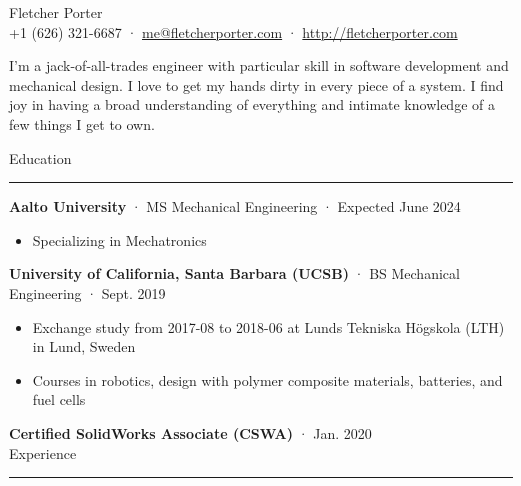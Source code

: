 \documentclass[12pt, oneside]{article}
\newcommand{\titlestyle}[1] {
	{\fontsize{40pt}{1em}\selectfont \textcolor{new_red}{\textsf{#1}}} \\
}
\newcommand{\headingstyleJobs}[1] {
	{\fontsize{18pt}{1em}\selectfont \textcolor{new_red}{\textsf{#1}}}
	\textcolor{new_red}{\rule{3.25in}{0.5pt}} \vspace{3pt}
}
\newcommand{\infostyle}[1] {
	{\selectfont #1} \\ %
}
\newcommand{\jobtitle}[3] {
	{\bf #1} · {#2} · {#3} \vspace{-7pt} \\
}
\newcommand{\certification}[2] {
	{\bf #1} · {#2} \vspace{5pt} \\
}
\renewenvironment{quote}{%
  \list{}{%
    \leftmargin4pt
    \rightmargin\leftmargin
  }
  \item\relax
}
{\endlist}
\newcommand{\overview}[1] {
	\begin{quote}
		#1
	\end{quote}
}
\begin{document}
\begin{flushleft}



\titlestyle{Fletcher Porter}
\infostyle{+1 (626) 321-6687 · \href{mailto:me@fletcherporter.com}{me@fletcherporter.com} · \url{http://fletcherporter.com}}

\overview{
I'm a jack-of-all-trades engineer with particular skill in software
development and mechanical design.  I love to get my hands dirty in every piece
of a system.  I find joy in having a broad understanding of everything and
intimate knowledge of a few things I get to own.
}

\headingstyleJobs{Education}

\jobtitle{Aalto University}{MS Mechanical Engineering}{Expected June 2024}
\begin{itemize}
    \item Specializing in Mechatronics
\end{itemize}

\jobtitle{University of California, Santa Barbara (UCSB)}{BS Mechanical Engineering}{Sept. 2019}
\begin{itemize}
	\item Exchange study from 2017-08 to 2018-06 at Lunds Tekniska Högskola (LTH) in Lund, Sweden \\
	\item Courses in robotics, design with polymer composite materials, batteries, and fuel cells
\end{itemize}


\certification{Certified SolidWorks Associate (CSWA)}{Jan. 2020}


\headingstyleJobs{Experience}


\end{flushleft}
\end{document}

